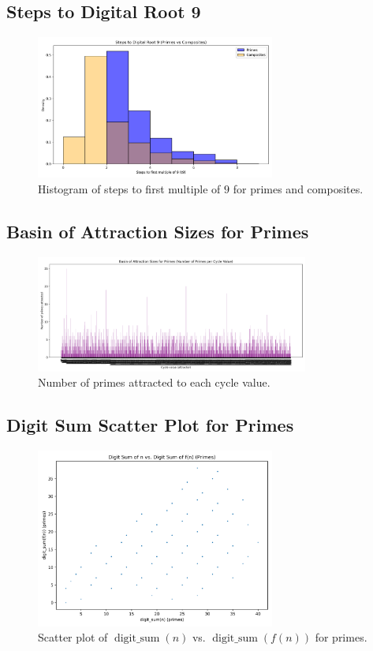 \documentclass[12pt]{article}
\begin{document}
\subsection{Steps to Digital Root 9}
\begin{figure}[H]
    \centering
    \includegraphics[width=0.7\textwidth]{fig_steps_to_droot9.png}
    \caption{Histogram of steps to first multiple of $9$ for primes and composites.}
    \label{fig:steps_to_droot9}
\end{figure}

\subsection{Basin of Attraction Sizes for Primes}
\begin{figure}[H]
    \centering
    \includegraphics[width=0.8\textwidth]{fig_basin_attraction_primes.png}
    \caption{Number of primes attracted to each cycle value.}
    \label{fig:basin_attraction}
\end{figure}

\subsection{Digit Sum Scatter Plot for Primes}
\begin{figure}[H]
    \centering
    \includegraphics[width=0.7\textwidth]{fig_digit_sum_scatter_primes.png}
    \caption{Scatter plot of $\operatorname{digit\_sum}(n)$ vs. $\operatorname{digit\_sum}(f(n))$ for primes.}
    \label{fig:digit_sum_scatter}
\end{figure}
\end{document}
